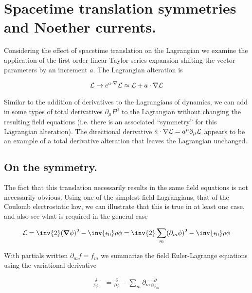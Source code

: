 \section{Spacetime translation symmetries and Noether currents.}

Considering the effect of spacetime translation on the Lagrangian we examine the application of the first order linear Taylor series expansion shifting the vector parameters by an increment $a$.  The Lagrangian alteration is

\begin{align}\label{eqn:rotationCurrents:goo1}
\mathcal{L} \rightarrow e^{a \cdot \nabla }\mathcal{L} \approx \mathcal{L} + a \cdot \nabla \mathcal{L}
\end{align}

Similar to the addition of derivatives to the Lagrangians of dynamics, we can add in some types of total derivatives $\partial_\mu F^\mu$ to the Lagrangian without changing the resulting field equations (i.e. there is an associated ``symmetry'' for this Lagrangian alteration).  The directional derivative $a \cdot \nabla \mathcal{L} = a^\mu \partial_\mu \mathcal{L}$ appears to be an example of a total derivative alteration that leaves the Lagrangian unchanged.

\subsection{On the symmetry.}

The fact that this translation necessarily results in the same field equations is not necessarily obvious.  Using one of the simplest field Lagrangians, that of the Coulomb electrostatic law, we can illustrate that this is true in at least one case, and also see what is required in the general case

\begin{align}\label{eqn:rotationCurrents:goo2}
\LL = \inv{2} (\spacegrad \phi)^2 - \inv{\epsilon_0}\rho \phi = \inv{2} \sum_m(\partial_m \phi)^2 - \inv{\epsilon_0}\rho \phi
\end{align}

With partials written $\partial_m f = f_m$ we summarize the field Euler-Lagrange equations using the variational derivative

\begin{align}\label{eqn:rotationCurrents:goo3}
\frac{\delta }{\delta \phi} &=
\frac{\partial }{\partial \phi} - \sum_m \partial_m \frac{\partial }{\partial \phi_m}
\end{align}

